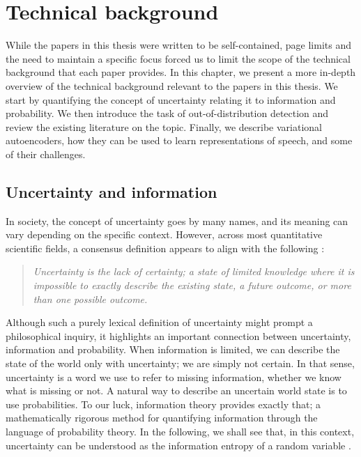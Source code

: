 

\chapter[technical background]{Technical background}\label{chp:technical-background}

While the papers in this thesis were written to be self-contained, page limits and the need to maintain a specific focus forced us to limit the scope of the technical background that each paper provides. In this chapter, we present a more in-depth overview of the technical background relevant to the papers in this thesis. 
We start by quantifying the concept of uncertainty relating it to information and probability. We then introduce the task of out-of-distribution detection and review the existing literature on the topic. 
Finally, we describe variational autoencoders, how they can be used to learn representations of speech, and some of their challenges. %


\section{Uncertainty and information} \label{sec:uncertainty-information-theory}

In society, the concept of uncertainty goes by many names, and its meaning can vary depending on the specific context. However, across most quantitative scientific fields, a consensus definition appears to align with the following \parencite{hubbard_how_2014}:
%
\begin{quote}
    \centering\itshape
    Uncertainty is the lack of certainty; a state of limited knowledge where it is impossible to exactly describe the existing state, a future outcome, or more than one possible outcome.
\end{quote}
%
Although such a purely lexical definition of uncertainty might prompt a philosophical inquiry, it highlights an important connection between uncertainty, information and probability. When information is limited, we can describe the state of the world only with uncertainty; we are simply not certain. In that sense, uncertainty is a word we use to refer to missing information, whether we know what is missing or not. 
A natural way to describe an uncertain world state is to use probabilities. To our luck, information theory provides exactly that; a mathematically rigorous method for quantifying information through the language of probability theory. In the following, we shall see that, in this context, uncertainty can be understood as the information entropy of a random variable \parencite{mackay_information_2003}. 


